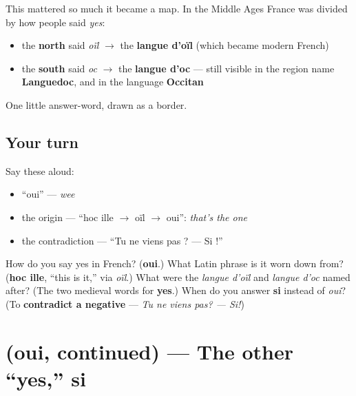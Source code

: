 \begin{culture}
This mattered so much it became a map. In the Middle Ages France was divided by how people said \emph{yes}:

\begin{itemize}
\raggedright
  \item the \textbf{north} said \emph{oïl} $\to$ the \textbf{langue d'oïl} (which became modern French)
  \item the \textbf{south} said \emph{oc} $\to$ the \textbf{langue d'oc} — still visible in the region name \textbf{Languedoc}, and in the language \textbf{Occitan}
\end{itemize}

One little answer-word, drawn as a border.
\end{culture}

\subsection*{Your turn}
Say these aloud:

\begin{itemize}
\raggedright
  \item \textquotedblleft{}oui\textquotedblright{} — \emph{wee}
  \item the origin — \textquotedblleft{}hoc ille $\to$ oïl $\to$ oui\textquotedblright{}: \emph{that's the one}
  \item the contradiction — \textquotedblleft{}Tu ne viens pas ? — Si !\textquotedblright{}
\end{itemize}

\begin{tcolorbox}[breakable,colback=teal!4,colframe=teal!35!black,title={Before you move on}]
How do you say yes in French? (\textbf{oui}.) What Latin phrase is it worn down from? (\textbf{hoc ille}, \textquotedblleft{}this is it,\textquotedblright{} via \emph{oïl}.) What were the \emph{langue d'oïl} and \emph{langue d'oc} named after? (The two medieval words for \textbf{yes}.) When do you answer \textbf{si} instead of \emph{oui}? (To \textbf{contradict a negative} — \emph{Tu ne viens pas? — Si!})
\end{tcolorbox}
\section[(oui, continued)]{(oui, continued) — The other “yes,” si}

\label{lesson:FR-C18-oui-more}



